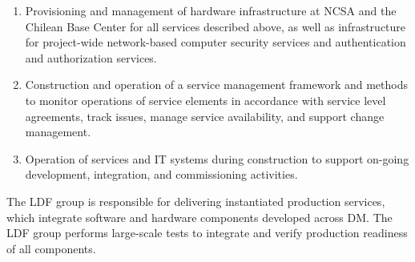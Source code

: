 \begin{enumerate}
	\item	Provisioning and management of hardware infrastructure at NCSA and the Chilean Base Center for all services described above, as well as infrastructure for project-wide network-based computer security services and authentication and authorization services.
	\item	\gls{Construction} and operation of a service management framework and methods to monitor operations of service elements in accordance with service level agreements, track issues, manage service availability, and support change management.
	\item	Operation of services and \gls{IT} systems during construction to support on-going development, integration, and commissioning activities.
\end{enumerate}
The \gls{LDF} group is responsible for delivering instantiated production services, which integrate software and hardware components developed across \gls{DM}. The \gls{LDF} group performs large-scale tests to integrate and verify production readiness of all components.
